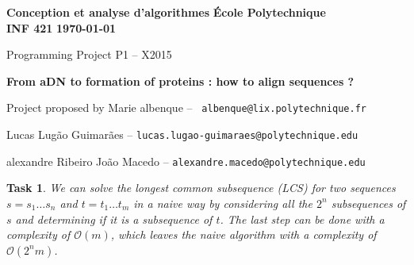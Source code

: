 \documentclass[11pt]{article} %
\theoremstyle{problemstyle}
\newtheorem{exercise}{Task}	%
\renewcommand*{\O}{\mathcal{O}}
\begin{document}
\noindent
\normalsize\textbf{Conception et analyse d'algorithmes} \hfill \textbf{École Polytechnique}\\
\normalsize\textbf{INF 421} \hfill \textbf{\today}\vspace{20pt}
\centerline{\Large Programming Project P1 – X2015}\vspace{5pt}
\centerline{\Large \textbf{From aDN to formation of proteins : how to align sequences ?}}\vspace{3pt}
\centerline{Project proposed by Marie albenque -- \texttt{ albenque@lix.polytechnique.fr}}\vspace{13pt}
\centerline{Lucas Lugão Guimarães -- \texttt{lucas.lugao-guimaraes@polytechnique.edu}}
\centerline{alexandre Ribeiro João Macedo --  \texttt{alexandre.macedo@polytechnique.edu}}\vspace{20pt}


\begin{exercise} %
We can solve the longest common subsequence (LCS) for two sequences $s=s_1\dots s_n$ and $t=t_1\dots t_m$ in a naive way by considering all the $2^{n}$ subsequences of $s$ and determining if it is a subsequence of $t$. The last step can be done with a complexity of $\O(m)$, which leaves the naive algorithm with a complexity of $\O(2^{n}m)$.
\end{exercise}
\end{document}
